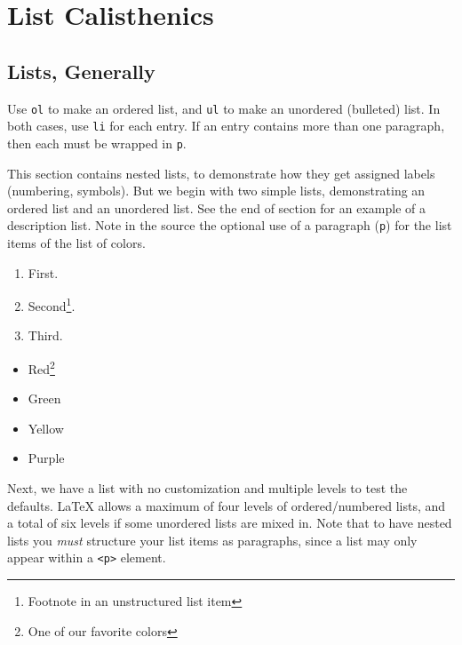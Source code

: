 \documentclass{amsart}
\theoremstyle{plain}%
\theoremstyle{definition}%
\theoremstyle{remark}%
\newcommand{\mono}[1]{\texttt{#1}}
\numberwithin{equation}{section}
\begin{document}
\section{List Calisthenics}\label{section-lists}%
%
%
\typeout{************************************************}
\typeout{************************************************}
%
\subsection{Lists, Generally}\label{section-lists-2}%
%
%
%
%
Use \mono{ol} to make an ordered list, and \mono{ul} to make an unordered (bulleted) list. In both cases, use \mono{li} for each entry.  If an entry contains more than one paragraph, then each must be wrapped in \mono{p}. %
\par
This section contains nested lists, to demonstrate how they get assigned labels (numbering, symbols). But we begin with two simple lists, demonstrating an ordered list and an unordered list. See the end of section for an example of a description list. Note in the source the optional use of a paragraph (\mono{p}) for the list items of the list of colors.%
\par
%
\begin{enumerate}
\item{}First.%
\item{}Second\footnote{Footnote in an unstructured list item\label{section-lists-2-8-1-2-1}}.%
\item{}Third.%
\end{enumerate}
%
\begin{itemize}[label=\textbullet]
\item{}Red\footnote{One of our favorite colors\label{section-lists-2-8-2-1-1-1}}%
\item{}Green%
\item{}Yellow%
\item{}Purple%
\end{itemize}
%
\par
Next, we have a list with no customization and multiple levels to test the defaults.  \LaTeX{} allows a maximum of four levels of ordered\slash{}numbered lists, and a total of six levels if some unordered lists are mixed in.  Note that to have nested lists you \emph{must} structure your list items as paragraphs, since a list may only appear within a \mono{<p>} element.%
\end{document}
